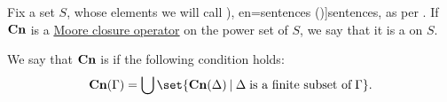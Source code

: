 \begin{definition}\label{def:consequence_operator}\mimprovised
  Fix a set \( S \), whose elements we will call \term[ru=предложения (\cite[103]{КолмогоровДрагалин2006Логика}), en=sentences (\cite[62]{Tarski1983MethodologyOfDeductiveSciences})]{sentences}, as per . If \( \op*{Cn} \) is a \hyperref[def:moore_closure_operator]{Moore closure operator} on the power set of \( S \), we say that it is a  on \( S \).

  \begin{thmenum}
     We say that \( \op*{Cn} \) is  if the following condition holds:
    \begin{equation}\label{eq:def:consequence_operator/compactness}
      \op*{Cn}(\Gamma) = \bigcup\set{ \op*{Cn}(\Delta) \given \Delta \T{is a finite subset of} \Gamma }.
    \end{equation}
  \end{thmenum}
\end{definition}
